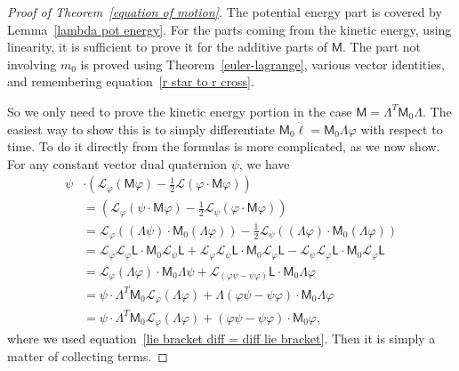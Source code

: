 \documentclass[reqno,12pt]{amsart}
\newcommand{\liederiv}{\mathcal L}
\begin{document}
\begin{proof}[Proof of Theorem~\ref{equation of motion}] The potential energy part is covered by Lemma~\ref{lambda pot energy}.  For the parts coming from the kinetic energy, using linearity, it is sufficient to prove it for the additive parts of $\mathsf M$.  The part not involving $m_0$ is proved using Theorem~\ref{euler-lagrange}, various vector identities, and remembering equation~\eqref{r star to r cross}.

So we only need to prove the kinetic energy portion in the case $\mathsf M = \mathsf \Lambda^T \mathsf M_0 \mathsf \Lambda$.  The easiest way to show this is to simply differentiate $\mathsf M_0 \dot \ell = \mathsf M_0 \mathsf\Lambda\varphi$ with respect to time.  To do it directly from the formulas is more complicated, as we now show.  For any constant vector dual quaternion $\psi$, we have
\begin{equation}
\begin{aligned}
\psi &\cdot (\liederiv_\varphi(\mathsf M \varphi) - \tfrac12 \liederiv(\varphi \cdot \mathsf M \varphi)) \\
&= (\liederiv_\varphi(\psi \cdot \mathsf M \varphi) - \tfrac12 \liederiv_\psi(\varphi \cdot \mathsf M \varphi)) \\
&= \liederiv_\varphi ((\mathsf \Lambda \psi) \cdot \mathsf M_0 (\mathsf \Lambda \varphi))
- \tfrac12 \liederiv_\psi  ((\mathsf \Lambda \varphi) \cdot \mathsf M_0(\mathsf \Lambda \varphi)) \\
&= \liederiv_\varphi \liederiv_\varphi \mathsf L \cdot \mathsf M_0 \liederiv_\psi \mathsf L
+ \liederiv_\varphi \liederiv_\psi \mathsf L \cdot \mathsf M_0\liederiv_\varphi \mathsf L - \liederiv_\psi \liederiv_\varphi \mathsf L \cdot \mathsf M_0\liederiv_\varphi \mathsf L \\
&= \liederiv_\varphi (\mathsf\Lambda \varphi) \cdot \mathsf M_0\mathsf\Lambda \psi
+ \liederiv_{(\varphi \psi - \psi \varphi)} \mathsf L \cdot \mathsf M_0\mathsf\Lambda \varphi \\
&= \psi \cdot \mathsf\Lambda^T \mathsf M_0 \liederiv_\varphi (\mathsf \Lambda \varphi)
+ \mathsf \Lambda (\varphi\psi - \psi\varphi) \cdot \mathsf M_0 \mathsf \Lambda \varphi
\\
&= \psi \cdot \mathsf\Lambda^T \mathsf M_0\liederiv_\varphi (\mathsf \Lambda \varphi)
+ (\varphi\psi - \psi\varphi) \cdot \mathsf M_0 \varphi,
\end{aligned}
\end{equation}
where we used equation~\eqref{lie bracket diff = diff lie bracket}.  Then it is simply a matter of collecting terms.
\end{proof}
\end{document}
